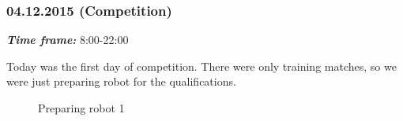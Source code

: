 \subsubsection{04.12.2015 (Competition)}
\textit{\textbf{Time frame:}} 8:00-22:00

Today was the first day of competition. There were only training matches, so we were just preparing robot for the qualifications.

\begin{figure}[H]
	\begin{minipage}[h]{0.31\linewidth}
		\caption{Preparing robot 1}
	\end{minipage}
	\hfill
	\begin{minipage}[h]{0.31\linewidth}

\end{minipage}
\end{figure}
